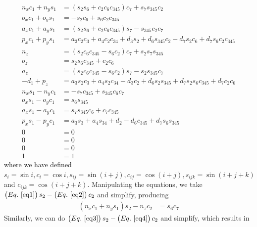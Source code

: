 \documentclass{article}
\begin{document}
\begin{align}
n_{x} c_1 + n_{y} s_1 &= \left(s_{2} s_{6} + c_{2} c_{6} c_{345}\right) c_{7} + s_{7} s_{345} c_{2} \label{eq1} \\
o_{x} c_1 + o_{y} s_1 &= - s_{2} c_{6} + s_{6} c_{2} c_{345} \label{eq5} \\
a_{x} c_1 + a_{y} s_1 &= \left(s_{2} s_{6} + c_{2} c_{6} c_{345}\right) s_{7} - s_{345} c_{2} c_{7} \label{eq7} \\
p_{x} c_1 + p_{y} s_1 &= a_{3} c_{2} c_{3} + a_{4} c_{2} c_{34} + d_{3} s_{2} + d_{6} s_{345} c_{2} - d_{7} s_{2} c_{6} + d_{7} s_{6} c_{2} c_{345} \label{eq3} \\
n_{z}                 &= \left(s_{2} c_{6} c_{345} - s_{6} c_{2}\right) c_{7} + s_{2} s_{7} s_{345} \label{eq2} \\
o_{z}                 &= s_{2} s_{6} c_{345} + c_{2} c_{6} \label{eq6} \\
a_{z}                 &= \left(s_{2} c_{6} c_{345} - s_{6} c_{2}\right) s_{7} - s_{2} s_{345} c_{7} \label{eq8} \\
- d_{1} + p_{z}       &= a_{3} s_{2} c_{3} + a_{4} s_{2} c_{34} - d_{3} c_{2} + d_{6} s_{2} s_{345} + d_{7} s_{2} s_{6} c_{345} + d_{7} c_{2} c_{6} \label{eq4} \\
n_{x} s_1 - n_{y} c_1 &= - s_{7} c_{345} + s_{345} c_{6} c_{7} \label{th51}\\
o_{x} s_1 - o_{y} c_1 &= s_{6} s_{345} \label{th53} \\
a_{x} s_1 - a_{y} c_1 &= s_{7} s_{345} c_{6} + c_{7} c_{345} \label{th52} \\
p_{x} s_1 - p_{y} c_1 &= a_{3} s_{3} + a_{4} s_{34} + d_{2} - d_{6} c_{345} + d_{7} s_{6} s_{345} \\
0                     &= 0 \\
0                     &= 0 \\
0                     &= 0 \\
1                     &= 1
\end{align}
where we have defined $s_i = \sin{i}, c_i = \cos{i}, s_{ij} = \sin{\left(i+j\right)}, c_{ij} = \cos{\left(i+j\right)}, s_{ijk} = \sin{\left(i+j+k\right)}$ and $c_{ijk} = \cos{\left(i+j+k\right)}$.
Manipulating the equations, we take $\left(Eq.~\ref{eq1} \right) s_2 - \left(Eq.~\ref{eq2} \right) c_2$ and simplify, producing
\begin{align}
\left(n_{x} c_1 + n_{y} s_1\right) s_2 - n_{z} c_2 &= s_{6} c_{7} \label{eqc3}
\end{align}
Similarly, we can do $\left(Eq.~\ref{eq3} \right) s_2-\left(Eq.~\ref{eq4}\right) c_2$ and simplify, which results in
\end{document}
